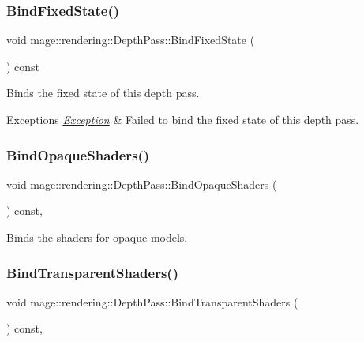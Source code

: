 \subsubsection{\texorpdfstring{Bind\+Fixed\+State()}{BindFixedState()}}
{\footnotesize\ttfamily void mage\+::rendering\+::\+Depth\+Pass\+::\+Bind\+Fixed\+State (\begin{DoxyParamCaption}{ }\end{DoxyParamCaption}) const\hspace{0.3cm}{\ttfamily [noexcept]}}

Binds the fixed state of this depth pass.


\begin{DoxyExceptions}{Exceptions}
{\em \hyperlink{classmage_1_1_exception}{Exception}} & Failed to bind the fixed state of this depth pass. \\
\hline
\end{DoxyExceptions}
\hypertarget{classmage_1_1rendering_1_1_depth_pass_aeab0d647dbdc50233cfa4169282682fe}{}\label{classmage_1_1rendering_1_1_depth_pass_aeab0d647dbdc50233cfa4169282682fe} 
\subsubsection{\texorpdfstring{Bind\+Opaque\+Shaders()}{BindOpaqueShaders()}}
{\footnotesize\ttfamily void mage\+::rendering\+::\+Depth\+Pass\+::\+Bind\+Opaque\+Shaders (\begin{DoxyParamCaption}{ }\end{DoxyParamCaption}) const\hspace{0.3cm}{\ttfamily [private]}, {\ttfamily [noexcept]}}

Binds the shaders for opaque models. \hypertarget{classmage_1_1rendering_1_1_depth_pass_a7c136dce9484e14b4a803f9ec84a10b8}{}\label{classmage_1_1rendering_1_1_depth_pass_a7c136dce9484e14b4a803f9ec84a10b8} 
\subsubsection{\texorpdfstring{Bind\+Transparent\+Shaders()}{BindTransparentShaders()}}
{\footnotesize\ttfamily void mage\+::rendering\+::\+Depth\+Pass\+::\+Bind\+Transparent\+Shaders (\begin{DoxyParamCaption}{ }\end{DoxyParamCaption}) const\hspace{0.3cm}{\ttfamily [private]}, {\ttfamily [noexcept]}}

